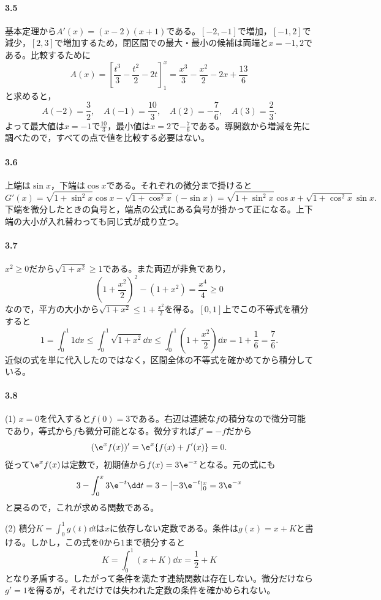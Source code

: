 \paragraph{3.5}
基本定理から$A'(x)=(x-2)(x+1)$である。$[-2,-1]$で増加，$[-1,2]$で減少，$[2,3]$で増加するため，閉区間での最大・最小の候補は両端と$x=-1,2$である。比較するために
\[
 A(x)=\left[\frac{t^3}{3}-\frac{t^2}{2}-2t\right]_1^x
 =\frac{x^3}{3}-\frac{x^2}{2}-2x+\frac{13}{6}
\]
と求めると，
\[
 A(-2)=\frac32,\quad A(-1)=\frac{10}{3},\quad
 A(2)=-\frac76,\quad A(3)=\frac23.
\]
よって最大値は$x=-1$で$\frac{10}{3}$，最小値は$x=2$で$-\frac76$である。導関数から増減を先に調べたので，すべての点で値を比較する必要はない。

\paragraph{3.6}
上端は$\sin x$，下端は$\cos x$である。それぞれの微分まで掛けると
\[
 G'(x)=\sqrt{1+\sin^2x}\cos x
       -\sqrt{1+\cos^2x}(-\sin x)
 =\sqrt{1+\sin^2x}\cos x+\sqrt{1+\cos^2x}\sin x.
\]
下端を微分したときの負号と，端点の公式にある負号が掛かって正になる。上下端の大小が入れ替わっても同じ式が成り立つ。

\paragraph{3.7}
$x^2\ge0$だから$\sqrt{1+x^2}\ge1$である。また両辺が非負であり，
\[
 \left(1+\frac{x^2}{2}\right)^2-(1+x^2)=\frac{x^4}{4}\ge0
\]
なので，平方の大小から$\sqrt{1+x^2}\le1+\frac{x^2}{2}$を得る。$[0,1]$上でこの不等式を積分すると
\[
 1=\int_0^1 1\dd x
 \le\int_0^1\sqrt{1+x^2}\dd x
 \le\int_0^1\left(1+\frac{x^2}{2}\right)\dd x
 =1+\frac16=\frac76.
\]
近似の式を単に代入したのではなく，区間全体の不等式を確かめてから積分している。

\paragraph{3.8}
(1) $x=0$を代入すると$f(0)=3$である。右辺は連続な$f$の積分なので微分可能であり，等式から$f$も微分可能となる。微分すれば$f'=-f$だから
\[
 (\e^xf(x))'=\e^x\{f(x)+f'(x)\}=0.
\]
従って$\e^xf(x)$は定数で，初期値から$f(x)=3\e^{-x}$となる。元の式にも
\[
 3-\int_0^x3\e^{-t}\dd t
 =3-[-3\e^{-t}]_0^x=3\e^{-x}
\]
と戻るので，これが求める関数である。

(2) 積分$K=\int_0^1g(t)\dd t$は$x$に依存しない定数である。条件は$g(x)=x+K$と書ける。しかし，この式を$0$から$1$まで積分すると
\[
 K=\int_0^1(x+K)\dd x=\frac12+K
\]
となり矛盾する。したがって条件を満たす連続関数は存在しない。微分だけなら$g'=1$を得るが，それだけでは失われた定数の条件を確かめられない。
